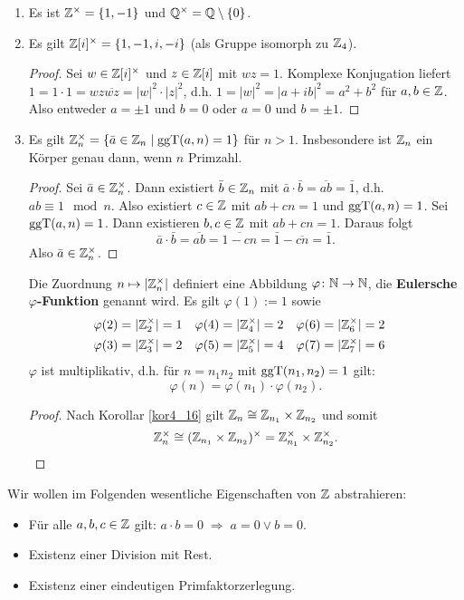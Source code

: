 \begin{beispiel}\label{beispiel5_3}
	\begin{enumerate}[label=(\arabic*)]
		\item Es ist $\mathbb{Z}^\times = \{1,-1\}$ und $\mathbb{Q}^\times = \mathbb{Q} \setminus \{0\}$.
		\item Es gilt $\mathbb{Z}[i]^\times = \{1,-1,i,-i\}$ (als Gruppe isomorph zu $\mathbb{Z}_4$).
		\begin{proof}
			Sei $w \in \mathbb{Z}[i]^\times$ und $z \in \mathbb{Z}[i]$ mit $wz = 1$. Komplexe Konjugation liefert $1 = 1\cdot 1 = wz \overline{wz} = |w|^2 \cdot |z|^2$, d.h. $1 = |w|^2 = |a + ib|^2 = a^2 + b^2$ für $a,b \in \mathbb{Z}$. Also entweder $a = \pm 1$ und $b = 0$ oder $a = 0$ und $b = \pm 1$.
		\end{proof}
		\item Es gilt $\mathbb{Z}_n^\times = \{\bar{a} \in \mathbb{Z}_n \mid \mathrm{ggT}(a,n) =1\}$ für $n > 1$. Insbesondere ist $\mathbb{Z}_n$ ein Körper genau dann, wenn $n$ Primzahl.
		\begin{proof}
			Sei $\bar{a} \in \mathbb{Z}_n^\times$. Dann existiert $\bar{b} \in \mathbb{Z}_n$ mit $\bar{a}\cdot\bar{b} = \overline{ab} = \bar{1}$, d.h. $ab \equiv 1 \mod n$. Also existiert $c \in \mathbb{Z}$ mit $ab + cn = 1$ und $\mathrm{ggT}(a,n) = 1$. Sei $\mathrm{ggT}(a,n) = 1$. Dann existieren $b,c \in \mathbb{Z}$ mit $ab + cn = 1$. Daraus folgt
			\[\bar{a}\cdot\bar{b} = \overline{ab} = \overline{1 -cn} = \bar{1} - \overline{cn} = \bar{1}.\]
			Also $\bar{a} \in \mathbb{Z}_n^\times$.
		\end{proof}
		Die Zuordnung $n \mapsto |\mathbb{Z}_n^\times|$ definiert eine Abbildung $\varphi \colon \mathbb{N}\to\mathbb{N}$, die \textbf{Eulersche $\varphi$-Funktion} genannt wird. Es gilt $\varphi(1) := 1$ sowie
		\begin{align*}
			&\varphi(2) = |\mathbb{Z}_2^\times| = 1& &\varphi(4) = |\mathbb{Z}_4^\times| = 2& &\varphi(6) = |\mathbb{Z}_6^\times| = 2&\\
			&\varphi(3) = |\mathbb{Z}_3^\times| = 2& &\varphi(5) = |\mathbb{Z}_5^\times| = 4& &\varphi(7) = |\mathbb{Z}_7^\times| = 6&
		\end{align*}
		$\varphi$ ist multiplikativ, d.h. für $n = n_1 n_2$ mit $\mathrm{ggT}(n_1, n_2) = 1$ gilt:
		\[\varphi(n) = \varphi(n_1) \cdot \varphi(n_2).\]
		\begin{proof}
			Nach Korollar \ref{kor4_16} gilt $\mathbb{Z}_n \cong \mathbb{Z}_{n_1} \times \mathbb{Z}_{n_2}$ und somit
			\[\mathbb{Z}_n^\times  \cong (\mathbb{Z}_{n_1} \times \mathbb{Z}_{n_2})^\times = \mathbb{Z}_{n_1}^\times \times \mathbb{Z}_{n_2}^\times.\]
		\end{proof}
	\end{enumerate}
\end{beispiel}
\begin{leftbar}
		Wir wollen im Folgenden wesentliche Eigenschaften von $\mathbb{Z}$ abstrahieren:
	\begin{itemize}
		\item Für alle $a,b,c \in \mathbb{Z}$ gilt: $a \cdot b = 0 \;\Rightarrow\; a=0 \lor b=0$.
		\item Existenz einer Division mit Rest.
		\item Existenz einer eindeutigen Primfaktorzerlegung.
	\end{itemize}
\end{leftbar}

